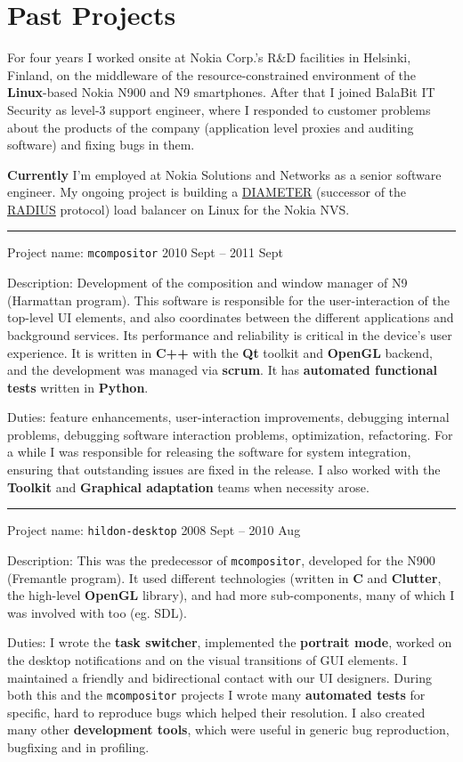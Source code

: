 \documentclass[a4paper,12pt]{article}
\newcommand\Yell{\textbf}
\newcommand\Label{\textsf}
\newcommand{\midline}{\rule[0.5ex]{\linewidth-\parindent}{.5pt}}
\begin{document}
\section{Past Projects}

For four years I worked onsite at Nokia Corp.'s R\&D facilities in Helsinki,
Finland, on the middleware of the resource-constrained environment of the
\Yell{Linux}-based Nokia N900 and N9 smartphones.  After that I joined
BalaBit IT Security as level-3 support engineer, where I responded to
customer problems about the products of the company (application level
proxies and auditing software) and fixing bugs in them.

\Yell{Currently} I'm employed at Nokia Solutions and Networks as a senior
software engineer.  My ongoing project is building a
\href{http://tools.ietf.org/html/rfc6733}{DIAMETER} (successor of the
\href{http://tools.ietf.org/html/rfc2865}{RADIUS} protocol) load balancer
on Linux for the Nokia NVS.

\midline\par
\Label{Project name}: \texttt{mcompositor}\hfill
\Label{2010 Sept -- 2011 Sept}\par
\Label{Description}: Development of the composition and window manager of N9
(Harmattan program).  This software is responsible for the user-interaction
of the top-level UI elements, and also coordinates between the different
applications and background services.  Its performance and reliability is
critical in the device's user experience.  It is written in \Yell{C++} with
the \Yell{Qt} toolkit and \Yell{OpenGL} backend, and the development was
managed via \Yell{scrum}.  It has \Yell{automated functional tests} written in
\Yell{Python}.\par
\Label{Duties}: feature enhancements, user-interaction improvements,
debugging internal problems, debugging software interaction problems,
optimization, refactoring.  For a while I was responsible for releasing
the software for system integration, ensuring that outstanding issues
are fixed in the release.  I also worked with the \Yell{Toolkit} and
\Yell{Graphical adaptation} teams when necessity arose.

\midline\par
\Label{Project name}: \texttt{hildon-desktop}\hfill
\Label{2008 Sept -- 2010 Aug}\par
\Label{Description}: This was the predecessor of \texttt{mcompositor},
developed for the N900 (Fremantle program).  It used different technologies
(written in \Yell{C} and \Yell{Clutter}, the high-level \Yell{OpenGL}
library), and had more sub-components, many of which I was involved with
too (eg. SDL).\par
\Label{Duties}: I wrote the \Yell{task switcher}, implemented the
\Yell{portrait mode}, worked on the desktop notifications and on
the visual transitions of GUI elements.  I maintained a friendly and
bidirectional contact with our UI designers.  During both this and
the \texttt{mcompositor} projects I wrote many \Yell{automated tests}
for specific, hard to reproduce bugs which helped their resolution.
I also created many other \Yell{development tools}, which were useful
in generic bug reproduction, bugfixing and in profiling.
\end{document}

